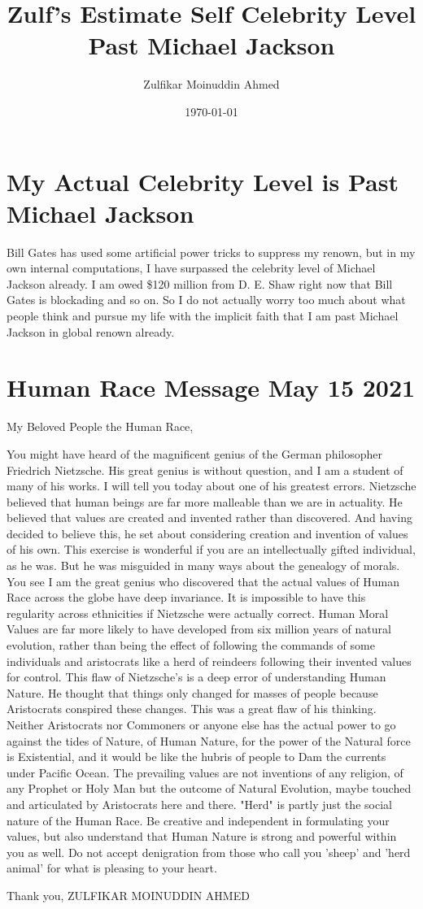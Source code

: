 \documentclass{amsart}
\title{Zulf's Estimate Self Celebrity Level Past Michael Jackson}
\author{Zulfikar Moinuddin Ahmed}
\date{\today}
\begin{document}
\maketitle

\section{My Actual Celebrity Level is Past Michael Jackson}

Bill Gates has used some artificial power tricks to suppress my renown, but in my own internal computations, I have surpassed the celebrity level of Michael Jackson already.  I am owed \$120 million from D. E. Shaw right now that Bill Gates is blockading and so on.  So I do not actually worry too much about what people think and pursue my life with the implicit faith that I am past Michael Jackson in global renown already.

\section{Human Race Message May 15 2021}
My Beloved People the Human Race,

You might have heard of the magnificent genius of the German philosopher Friedrich Nietzsche.  His great genius is without question, and I am a student of many of his works.  I will tell you today about one of his greatest errors.  Nietzsche believed that human beings are far more malleable than we are in actuality.  He believed that values are created and invented rather than discovered.  And having decided to believe this, he set about considering creation and invention of values of his own.  This exercise is wonderful if you are an intellectually gifted individual, as he was.  But he was misguided in many ways about the genealogy of morals.  You see I am the great genius who discovered that the actual values of Human Race across the globe have deep invariance.  It is impossible to have this regularity across ethnicities if Nietzsche were actually correct.  Human Moral Values are far more likely to have developed from six million years of natural evolution, rather than being the effect of following the commands of some individuals and aristocrats like a herd of reindeers following their invented values for control.  This flaw of Nietzsche's is a deep error of understanding Human Nature. He thought that things only changed for masses of people because Aristocrats conspired these changes.  This was a great flaw of his thinking.  Neither Aristocrats nor Commoners or anyone else has the actual power to go against the tides of Nature, of Human Nature, for the power of the Natural force is Existential, and it would be like the hubris of people to Dam the currents under Pacific Ocean.  The prevailing values are not inventions of any religion, of any Prophet or Holy Man but the outcome of Natural Evolution, maybe touched and articulated by Aristocrats here and there.  "Herd" is partly just the social nature of the Human Race.  Be creative and independent in formulating your values, but also understand that Human Nature is strong and powerful within you as well.  Do not accept denigration from those who call you 'sheep' and 'herd animal' for what is pleasing to your heart.

Thank you,
ZULFIKAR MOINUDDIN AHMED
\end{document}
